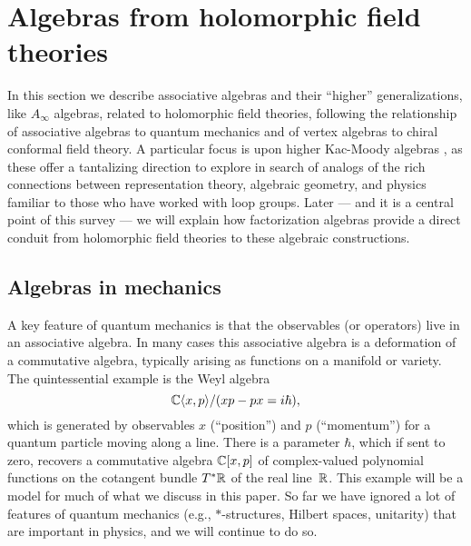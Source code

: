 \documentclass[11pt]{amsart}
\author{Owen Gwilliam and Brian R. Williams}
\date{\today}
\begin{document}

\section{Algebras from holomorphic field theories}

In this section we describe  associative algebras and their ``higher'' generalizations, like $A_\infty$ algebras, related to holomorphic field theories,
following the relationship of associative algebras to quantum mechanics and of vertex algebras to chiral conformal field theory.
A particular focus is upon higher Kac-Moody algebras \cite{FHK},
as these offer a tantalizing direction to explore in search of analogs of the rich connections between representation theory, algebraic geometry, and physics familiar to those who have worked with loop groups.
Later --- and it is a central point of this survey --- we will explain how factorization algebras provide a direct conduit from holomorphic field theories to these algebraic constructions.

\subsection{Algebras in mechanics}

A key feature of quantum mechanics is that the observables (or operators) live in an associative algebra.
In many cases this associative algebra is a deformation of a commutative algebra, typically arising as functions on a manifold or variety.
The quintessential example is the Weyl algebra
\[
\mathbb C \langle x, p \rangle /(xp - px = i \hbar),
\] 
which is generated by observables $x$ (``position'') and $p$ (``momentum'') for a quantum particle moving along a line.
There is a parameter $\hbar$, which if sent to zero, recovers a commutative algebra $\mathbb C [ x, p ]$ of complex-valued polynomial functions on the cotangent bundle $T^* \mathbb R$ of the real line~$\mathbb R$.
This example will be a model for much of what we discuss in this paper.
So far we have ignored a lot of features of quantum mechanics (e.g., $\ast$-structures, Hilbert spaces, unitarity) that are important in physics,
and we will continue to do so.
\end{document}
